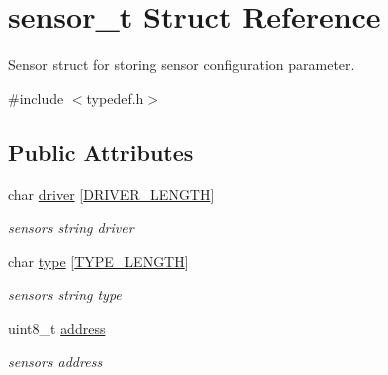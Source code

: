 \hypertarget{structsensor__t}{}\section{sensor\+\_\+t Struct Reference}
\label{structsensor__t}


Sensor struct for storing sensor configuration parameter.  




{\ttfamily \#include $<$typedef.\+h$>$}

\subsection*{Public Attributes}
\begin{DoxyCompactItemize}
\item 
\mbox{\label{structsensor__t_aa5ebe8eef40ef912b7da2cb7391d2cf9}} 
char \hyperlink{structsensor__t_aa5ebe8eef40ef912b7da2cb7391d2cf9}{driver} \mbox{[}\hyperlink{typedef_8h_a343127490097a8ef68ab7d577d01b38b}{D\+R\+I\+V\+E\+R\+\_\+\+L\+E\+N\+G\+TH}\mbox{]}
\begin{DoxyCompactList}\small\item\em sensor\textquotesingle{}s string driver \end{DoxyCompactList}\item 
\mbox{\label{structsensor__t_a1a2280bc32299e544c7d740299102277}} 
char \hyperlink{structsensor__t_a1a2280bc32299e544c7d740299102277}{type} \mbox{[}\hyperlink{typedef_8h_a7be6924e0d85f3f82149ea31cca36887}{T\+Y\+P\+E\+\_\+\+L\+E\+N\+G\+TH}\mbox{]}
\begin{DoxyCompactList}\small\item\em sensor\textquotesingle{}s string type \end{DoxyCompactList}\item 
\mbox{\label{structsensor__t_aa8e66f9050a38bb842b5a97cc3bc2358}} 
uint8\+\_\+t \hyperlink{structsensor__t_aa8e66f9050a38bb842b5a97cc3bc2358}{address}
\begin{DoxyCompactList}\small\item\em sensor\textquotesingle{}s address \end{DoxyCompactList}\item 
\mbox{\label{structsensor__t_a907c65079d3374ff1f18532cf41ccf13}} 

\end{DoxyCompactItemize}
